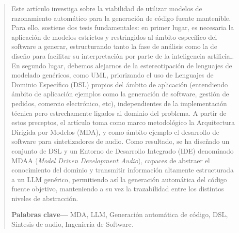 \begin{abstract}
    
    Este artículo investiga sobre la viabilidad de utilizar modelos de razonamiento automático para la generación de código fuente mantenible. Para ello, sostiene dos tesis fundamentales: en primer lugar, es necesaria la aplicación de modelos estrictos y restringidos al ámbito específico del software a generar, estructurando tanto la fase de análisis como la de diseño para facilitar su interpretación por parte de la inteligencia artificial. En segundo lugar, debemos alejarnos de la estereotipación de lenguajes de modelado genéricos, como UML, priorizando el uso de Lenguajes de Dominio Específico (DSL) propios del ámbito de aplicación (entendiendo ámbito de aplicación ejemplos como la generación de software, gestión de pedidos, comercio electrónico, etc), independientes de la implementación técnica pero estrechamente ligados al dominio del problema. A partir de estos preceptos, el artículo toma como marco metodológico la Arquitectura Dirigida por Modelos (MDA), y como ámbito ejemplo el desarrollo de software para sintetizadores de audio. Como resultado, se ha diseñado un conjunto de DSL y un Entorno de Desarrollo Integrado (IDE) denominado MDAA (\textit{Model Driven Development Audio}), capaces de abstraer el conocimiento del dominio y transmitir información altamente estructurada a un LLM genérico, permitiendo así la generación automática del código fuente objetivo, manteniendo a su vez la trazabilidad entre los distintos niveles de abstracción.

    \vspace{0.5em}
    \noindent\textbf{Palabras clave---} MDA, LLM, Generación automática de código, DSL, Síntesis de audio, Ingeniería de Software.
\end{abstract}
